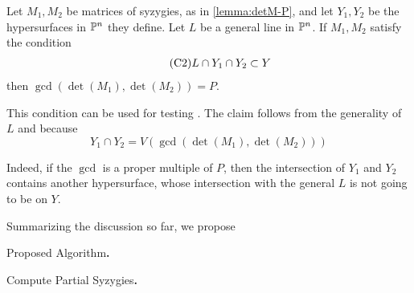 \documentclass[fleqn,reqno]{amsart}
\numberwithin{first}{chapter}
\begin{document}
\begin{paragraf}
Let $M_1,M_2$ be matrices of syzygies, as in \eqref{lemma:detM-P},
and let $Y_1,Y_2$ be the hypersurfaces in $\mathbb{P}^n$ they define.
Let $L$ be a general line in $\mathbb{P}^n$.
If $M_1,M_2$ satisfy the condition
\begin{align}
	\label{C:minors}
	\tag{C2}
	L\cap Y_1\cap Y_2\subset Y
\end{align}
then $\gcd(\det(M_1),\det(M_2))=P$.

This condition can be used for testing .
The claim follows from the generality of $L$ and because
\[
	Y_1\cap Y_2=V(\gcd(\det(M_1),\det(M_2)))
\]

Indeed, if the $\gcd$ is a proper multiple of $P$, then the intersection of
$Y_1$ and $Y_2$ contains another hypersurface, whose intersection with the general $L$
is not going to be on $Y$.
\end{paragraf}

\begin{paragraf*}
Summarizing the discussion so far, we propose
\end{paragraf*}

\begin{algorithm}{\sc Proposed Algorithm}{\bf.}
\label{algo:proposed}
\begin{algorithmic}
\EndWhile
{}
\end{algorithmic}
\end{algorithm}

\begin{algorithm}{\sc Compute Partial Syzygies}{\bf.}
\label{algo:compute-Ni}
\begin{algorithmic}
\EndFor
{}
\end{algorithmic}
\end{algorithm}
\end{document}
